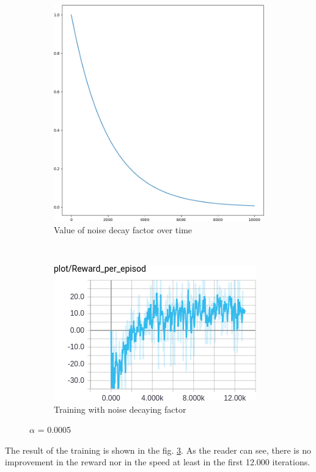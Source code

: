 \documentclass{article}
\begin{document}
\begin{figure}[ht]
  \centering
  \begin{subfigure}[b]{.4\textwidth}
    \centering
    \includegraphics[width=.7\textwidth]{noise_decay_function}
    \caption{Value of noise decay factor over time}
    \label{fig:noise_decay_factor}
  \end{subfigure}
  ~
  \begin{subfigure}[b]{.4\textwidth}
    \includegraphics[width=\textwidth]{study_nsf}
    \caption{Training with noise decaying factor}
    \label{fig:study_nsf}
  \end{subfigure}
  \caption{$\alpha$ = 0.0005}
\end{figure}

The result of the training is shown in the fig. \ref{fig:study_nsf}. As the
reader can see, there is no improvement in the reward nor in the speed at least
in the first 12.000 iterations.
\end{document}
